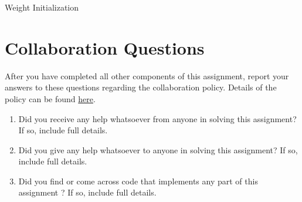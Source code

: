 \documentclass[11pt,addpoints,answers]{exam}
\newcommand{\alphav     }{\boldsymbol \alpha     }
\newcommand{\betav      }{\boldsymbol \beta      }
\begin{document}
\begin{questions}
\begin{parts}
\end{parts}

\question Weight Initialization



\end{questions}



\newpage

\section{Collaboration Questions}
After you have completed all other components of this assignment, report your answers to these questions regarding the collaboration policy. Details of the policy can be found \href{http://www.cs.cmu.edu/~mgormley/courses/10601/syllabus.html}{here}.
\begin{enumerate}
    \item Did you receive any help whatsoever from anyone in solving this assignment? If so, include full details.
    \item Did you give any help whatsoever to anyone in solving this assignment? If so, include full details.
    \item Did you find or come across code that implements any part of this assignment ? If so, include full details.
\end{enumerate}
\end{document}
